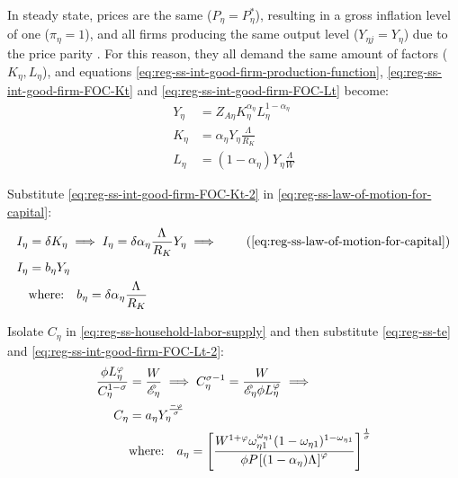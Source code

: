 \documentclass[
thesis.tex
]{subfiles}
\begin{document}
In steady state, prices are the same ($P_{\eta} = P_{\eta}^{\ast}$), resulting in a gross inflation level of one ($\pi_{\eta} = 1$), and all firms producing the same output level ($Y_{\eta j} = Y_{\eta}$) due to the price parity \cite[Lecture 13, p.12]{solis-garcia_ucb_2022}. For this reason, they all demand the same amount of factors ($K_{\eta}, L_{\eta}$), and equations \ref{eq:reg-ss-int-good-firm-production-function}, \ref{eq:reg-ss-int-good-firm-FOC-Kt} and \ref{eq:reg-ss-int-good-firm-FOC-Lt} become:
\begin{align}
	Y_{\eta} &= Z_{A\eta} K_{\eta}^{\alpha_{\eta}} L_{\eta}^{1 -{\alpha_{\eta}}} \label{eq:reg-ss-int-good-firm-production-function-2} \\	
	K_{\eta} &= {\alpha_{\eta}} Y_{\eta} \frac{\Lambda_{}}{R_K} \label{eq:reg-ss-int-good-firm-FOC-Kt-2} \\
	L_{\eta} &= (1-{\alpha_{\eta}}) Y_{\eta} \frac{\Lambda_{}}{W} \label{eq:reg-ss-int-good-firm-FOC-Lt-2}
\end{align}
	
	Substitute \ref{eq:reg-ss-int-good-firm-FOC-Kt-2} in \ref{eq:reg-ss-law-of-motion-for-capital}:
	\begin{align}
		I_{\eta} &= \delta K_{\eta} \implies I_{\eta} = \delta {\alpha_{\eta}} \frac{\Lambda_{}}{R_K} Y_{\eta} \implies \tag{\ref{eq:reg-ss-law-of-motion-for-capital}} \\
		I_{\eta} &= b_{\eta} Y_{\eta} \label{eq:reg-ss-investment} \\
		& \text{where:} \quad b_{\eta} = \delta {\alpha_{\eta}} \frac{\Lambda_{}}{R_K} \label{eq:reg-ss-b-eta}
	\end{align}
	
	Isolate $C_{\eta}$ in \ref{eq:reg-ss-household-labor-supply} and then substitute \ref{eq:reg-ss-te} and \ref{eq:reg-ss-int-good-firm-FOC-Lt-2}:
	\begin{align}
		\frac{\phi L_{\eta}^{\varphi}}{C_{\eta}^{1-\sigma}} &= \frac{W}{\te[]} \implies C_{\eta}^{\sigma -1} = \frac{W}{\te[] \phi L_{\eta}^{\varphi}} \implies \nonumber\\
		C_{\eta} &= a_{\eta} Y_{\eta}^{\frac{-\varphi}{\sigma}} \label{eq:reg-ss-consumption} \\
		& \text{where:} \quad a_{\eta} = \left[ \frac{W^{1 +\varphi} \omega_{\eta 1}^{\omega_{\eta 1}} (1 -\omega_{\eta 1})^{1 -\omega_{\eta 1}}}{\phi P_{} \left[ (1 -\alpha_{\eta}) \Lambda_{} \right]^{\varphi}} \right]^{\frac{1}{\sigma}} \label{eq:reg-ss-a-eta}
	\end{align}
\end{document}
